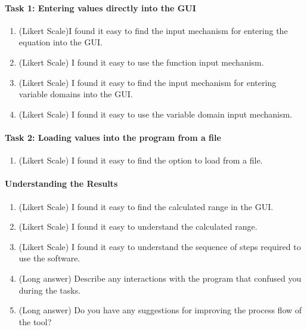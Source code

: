 \documentclass[12pt, titlepage]{article}
\begin{document}
\paragraph{Task 1: Entering values directly into the GUI}
\begin{enumerate}
	\item (Likert Scale)I found it easy to find the input mechanism for 
	entering 
	the equation into the GUI.
	
	\item (Likert Scale) I found it easy to use the function input mechanism.
	
	\item (Likert Scale) I found it easy to find the input mechanism for 
	entering variable domains into the GUI. 
	
	\item (Likert Scale) I found it easy to use the variable domain input 
	mechanism. 
\end{enumerate}

\paragraph{Task 2: Loading values into the program from a file}
\begin{enumerate}
	\item (Likert Scale) I found it easy to find the option to load from a file.
\end{enumerate}

\paragraph{Understanding the Results}
\begin{enumerate}
	\item (Likert Scale) I found it easy to find the calculated range in the 
	GUI.
	
	\item (Likert Scale) I found it easy to understand the calculated range. 
	
	\item (Likert Scale) I found it easy to understand the sequence of steps 
	required to use the software. 
	
	\item (Long answer) Describe any interactions with the program that 
	confused you during the tasks.
	
	\item (Long answer)  Do you have any suggestions for improving the process 
	flow of the tool?
\end{enumerate}
\end{document}
